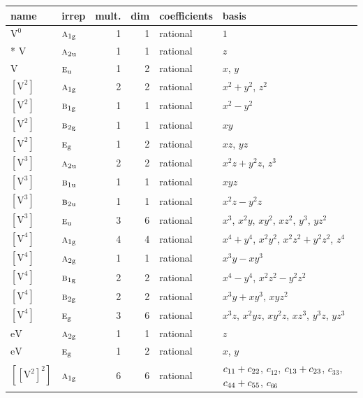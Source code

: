 \documentclass[10pt,a4paper]{article}
\numberwithin{equation}{section}
\newcommand{\irr}[1]{\text{\normalfont\scshape #1}}
\newcommand{\ptag}[1]{\mathrm{#1}}
\newcommand{\jahn}[1]{\mathrm{#1}}
\newlength{\fillwidth}\newlength{\cellwidth}\newlength{\colwidth}
\newcommand{\signbreak}{\penalty100\relax}
\begin{document}
{\begin{longtable}{@{}llrrl>{\RaggedRight\arraybackslash}p{\fillwidth}@{}}
name & irrep & mult. & dim & coefficients & basis\\\midrule\endhead
\bottomrule\endfoot\endlastfoot
$\jahn{V^{0}}$ & $\irr{a}_{1\ptag{g}}$ & 1 & 1 & rational & $1$\\*
$\jahn{V}$ & $\irr{a}_{2\ptag{u}}$ & 1 & 1 & rational & $z$\\
$\jahn{V}$ & $\irr{e}_{\ptag{u}}$ & 1 & 2 & rational & $x$, $y$\\
$\jahn{[V^{2}]}$ & $\irr{a}_{1\ptag{g}}$ & 2 & 2 & rational & $x^{2} + y^{2}$, $z^{2}$\\
$\jahn{[V^{2}]}$ & $\irr{b}_{1\ptag{g}}$ & 1 & 1 & rational & $x^{2} - y^{2}$\\
$\jahn{[V^{2}]}$ & $\irr{b}_{2\ptag{g}}$ & 1 & 1 & rational & $xy$\\
$\jahn{[V^{2}]}$ & $\irr{e}_{\ptag{g}}$ & 1 & 2 & rational & $xz$, $yz$\\
$\jahn{[V^{3}]}$ & $\irr{a}_{2\ptag{u}}$ & 2 & 2 & rational & $x^{2}z + y^{2}z$, $z^{3}$\\
$\jahn{[V^{3}]}$ & $\irr{b}_{1\ptag{u}}$ & 1 & 1 & rational & $xyz$\\
$\jahn{[V^{3}]}$ & $\irr{b}_{2\ptag{u}}$ & 1 & 1 & rational & $x^{2}z - y^{2}z$\\
$\jahn{[V^{3}]}$ & $\irr{e}_{\ptag{u}}$ & 3 & 6 & rational & $x^{3}$, $x^{2}y$, $xy^{2}$, $xz^{2}$, $y^{3}$, $yz^{2}$\\
$\jahn{[V^{4}]}$ & $\irr{a}_{1\ptag{g}}$ & 4 & 4 & rational & $x^{4} + y^{4}$, $x^{2}y^{2}$, $x^{2}z^{2} + y^{2}z^{2}$, $z^{4}$\\
$\jahn{[V^{4}]}$ & $\irr{a}_{2\ptag{g}}$ & 1 & 1 & rational & $x^{3}y - xy^{3}$\\
$\jahn{[V^{4}]}$ & $\irr{b}_{1\ptag{g}}$ & 2 & 2 & rational & $x^{4} - y^{4}$, $x^{2}z^{2} - y^{2}z^{2}$\\
$\jahn{[V^{4}]}$ & $\irr{b}_{2\ptag{g}}$ & 2 & 2 & rational & $x^{3}y + xy^{3}$, $xyz^{2}$\\
$\jahn{[V^{4}]}$ & $\irr{e}_{\ptag{g}}$ & 3 & 6 & rational & $x^{3}z$, $x^{2}yz$, $xy^{2}z$, $xz^{3}$, $y^{3}z$, $yz^{3}$\\
$\jahn{eV}$ & $\irr{a}_{2\ptag{g}}$ & 1 & 1 & rational & $z$\\
$\jahn{eV}$ & $\irr{e}_{\ptag{g}}$ & 1 & 2 & rational & $x$, $y$\\
$\jahn{[[V^{2}]^{2}]}$ & $\irr{a}_{1\ptag{g}}$ & 6 & 6 & rational & $c_{11} +\signbreak c_{22}$, $c_{12}$, $c_{13} +\signbreak c_{23}$, $c_{33}$, $c_{44} +\signbreak c_{55}$, $c_{66}$\\

\end{longtable}}
\end{document}
